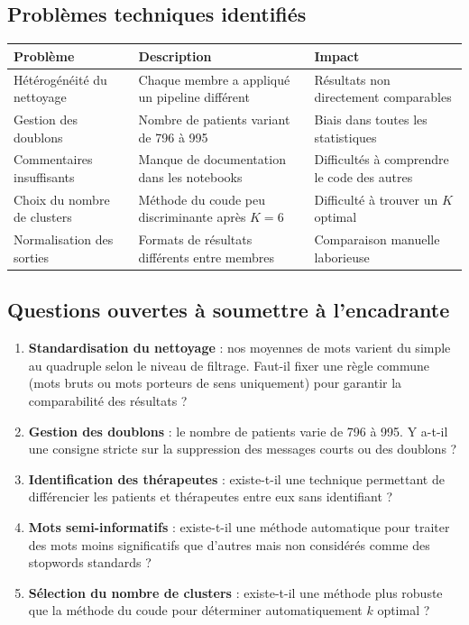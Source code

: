 \documentclass[12pt,a4paper]{article}
\begin{document}
\subsection{Problèmes techniques identifiés}

\begin{center}
\renewcommand{\arraystretch}{1.3}
\small
\begin{tabularx}{\textwidth}{@{}>{\raggedright\arraybackslash}p{2.8cm}X X@{}}
\toprule
\textbf{Problème} & \textbf{Description} & \textbf{Impact} \\
\midrule
Hétérogénéité du nettoyage
  & Chaque membre a appliqué un pipeline différent
  & Résultats non directement comparables \\
Gestion des doublons
  & Nombre de patients variant de 796 à 995
  & Biais dans toutes les statistiques \\
Commentaires insuffisants
  & Manque de documentation dans les notebooks
  & Difficultés à comprendre le code des autres \\
Choix du nombre de clusters
  & Méthode du coude peu discriminante après $K = 6$
  & Difficulté à trouver un $K$ optimal \\
Normalisation des sorties
  & Formats de résultats différents entre membres
  & Comparaison manuelle laborieuse \\
\bottomrule
\end{tabularx}
\end{center}

\subsection{Questions ouvertes à soumettre à l'encadrante}

\begin{enumerate}
  \item \textbf{Standardisation du nettoyage} : nos moyennes de mots varient du simple au quadruple selon le niveau de filtrage. Faut-il fixer une règle commune (mots bruts ou mots porteurs de sens uniquement) pour garantir la comparabilité des résultats ?

  \item \textbf{Gestion des doublons} : le nombre de patients varie de 796 à 995. Y a-t-il une consigne stricte sur la suppression des messages courts ou des doublons ?

  \item \textbf{Identification des thérapeutes} : existe-t-il une technique permettant de différencier les patients et thérapeutes entre eux sans identifiant ?

  \item \textbf{Mots semi-informatifs} : existe-t-il une méthode automatique pour traiter des mots moins significatifs que d'autres mais non considérés comme des stopwords standards ?

  \item \textbf{Sélection du nombre de clusters} : existe-t-il une méthode plus robuste que la méthode du coude pour déterminer automatiquement $k$ optimal ?
\end{enumerate}
\end{document}
